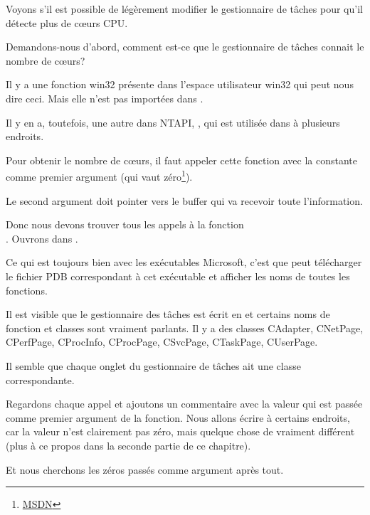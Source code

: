 
Voyons s'il est possible de légèrement modifier le gestionnaire de tâches pour qu'il
détecte plus de c\oe{}urs \ac{CPU}.


Demandons-nous d'abord, comment est-ce que le gestionnaire de tâches connait le nombre
de c\oe{}urs?

Il y a une fonction win32  présente dans l'espace utilisateur
win32 qui peut nous dire ceci.
Mais elle n'est pas importées dans .

Il y en a, toutefois, une autre dans \gls{NTAPI}, ,
qui est utilisée dans  à plusieurs endroits.

Pour obtenir le nombre de c\oe{}urs,  il faut appeler cette fonction avec la constante
 comme premier argument (qui vaut zéro\footnote{\href{http://msdn.microsoft.com/en-us/library/windows/desktop/ms724509(v=vs.85).aspx}{MSDN}}).

Le second argument doit pointer vers le buffer qui va recevoir toute l'information.

Donc nous devons trouver tous les appels à la fonction \\
.
Ouvrons  dans \IDA.

Ce qui est toujours bien avec les exécutables Microsoft, c'est que \IDA peut télécharger
le fichier \gls{PDB} correspondant à cet exécutable et afficher les noms de toutes
les fonctions. 

Il est visible que le gestionnaire des tâches est écrit en \Cpp et certains noms
de fonction et classes sont vraiment parlants.
Il y a des classes CAdapter, CNetPage, CPerfPage, CProcInfo, CProcPage, CSvcPage, 
CTaskPage, CUserPage.

Il semble que chaque onglet du gestionnaire de tâches ait une classe correspondante.

Regardons chaque appel et ajoutons un commentaire avec la valeur qui est passée comme
premier argument de la fonction.
Nous allons écrire  à certains endroits, car la valeur n'est clairement
pas zéro, mais quelque chose de vraiment différent (plus à ce propos dans la seconde
partie de ce chapitre).

Et nous cherchons les zéros passés comme argument après tout.

